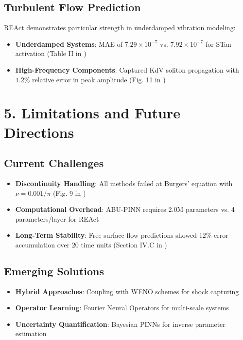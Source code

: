 \subsection*{Turbulent Flow Prediction}
REAct demonstrates particular strength in underdamped vibration modeling:
\begin{itemize}
    \item \textbf{Underdamped Systems}: MAE of $7.29 \times 10^{-7}$ vs. $7.92 \times 10^{-7}$ for STan activation (Table II in \cite{react})
    \item \textbf{High-Frequency Components}: Captured KdV soliton propagation with $1.2\%$ relative error in peak amplitude (Fig. 11 in \cite{abu_pinn})
\end{itemize}

\section*{5. Limitations and Future Directions}
\subsection*{Current Challenges}
\begin{itemize}
    \item \textbf{Discontinuity Handling}: All methods failed at Burgers' equation with $\nu=0.001/\pi$ (Fig. 9 in \cite{abu_pinn})
    \item \textbf{Computational Overhead}: ABU-PINN requires 2.0M parameters vs. 4 parameters/layer for REAct
    \item \textbf{Long-Term Stability}: Free-surface flow predictions showed 12\% error accumulation over 20 time units (Section IV.C in \cite{free_surface})
\end{itemize}

\subsection*{Emerging Solutions}
\begin{itemize}
    \item \textbf{Hybrid Approaches}: Coupling with WENO schemes for shock capturing \cite{react}
    \item \textbf{Operator Learning}: Fourier Neural Operators for multi-scale systems \cite{abu_pinn}
    \item \textbf{Uncertainty Quantification}: Bayesian PINNs for inverse parameter estimation \cite{free_surface}
\end{itemize}

